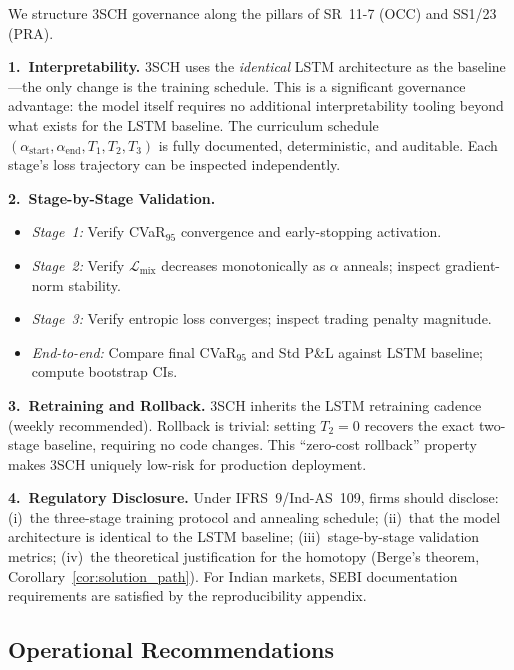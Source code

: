 \documentclass[11pt]{article}
\begin{document}
We structure 3SCH governance along the pillars of SR~11-7 (OCC) and SS1/23 (PRA).

\textbf{1.\ Interpretability.}
3SCH uses the \emph{identical} LSTM architecture as the baseline---the only change is the training schedule.  This is a significant governance advantage: the model itself requires no additional interpretability tooling beyond what exists for the LSTM baseline.  The curriculum schedule $(\alpha_{\mathrm{start}}, \alpha_{\mathrm{end}}, T_1, T_2, T_3)$ is fully documented, deterministic, and auditable.  Each stage's loss trajectory can be inspected independently.

\textbf{2.\ Stage-by-Stage Validation.}
\begin{itemize}[noitemsep]
    \item \textit{Stage~1:} Verify CVaR$_{95}$ convergence and early-stopping activation.
    \item \textit{Stage~2:} Verify $\mathcal{L}_{\mathrm{mix}}$ decreases monotonically as $\alpha$ anneals; inspect gradient-norm stability.
    \item \textit{Stage~3:} Verify entropic loss converges; inspect trading penalty magnitude.
    \item \textit{End-to-end:} Compare final CVaR$_{95}$ and Std P\&L against LSTM baseline; compute bootstrap CIs.
\end{itemize}

\textbf{3.\ Retraining and Rollback.}
3SCH inherits the LSTM retraining cadence (weekly recommended).  Rollback is trivial: setting $T_2=0$ recovers the exact two-stage baseline, requiring no code changes.  This ``zero-cost rollback'' property makes 3SCH uniquely low-risk for production deployment.

\textbf{4.\ Regulatory Disclosure.}
Under IFRS~9/Ind-AS~109, firms should disclose: (i)~the three-stage training protocol and annealing schedule; (ii)~that the model architecture is identical to the LSTM baseline; (iii)~stage-by-stage validation metrics; (iv)~the theoretical justification for the homotopy (Berge's theorem, Corollary~\ref{cor:solution_path}).  For Indian markets, SEBI documentation requirements are satisfied by the reproducibility appendix.

\subsection{Operational Recommendations}
\end{document}
